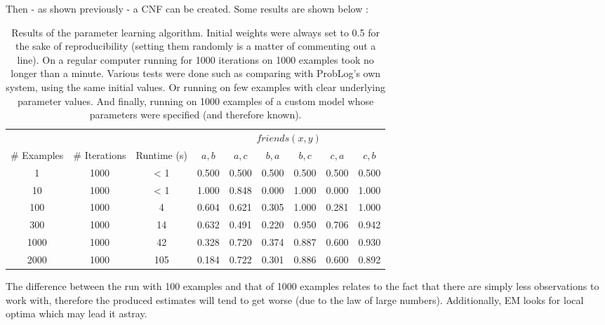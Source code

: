 \par\noindent Then - as shown previously - a CNF can be created. Some results are shown below :

\begin{table}[h]
\centering
\begin{tabular}{ccc|cccccc}
& & & \multicolumn{6}{c}{$friends(x,y)$}\\
\# Examples & \# Iterations & Runtime (s) & $a,b$ & $a,c$ & $b,a$ & $b,c$ & $c,a$ & $c,b$\\\hline
1 & 1000 & < 1 & 0.500 & 0.500 & 0.500 & 0.500 & 0.500 & 0.500 \\
10 & 1000 & < 1 & 1.000 & 0.848 & 0.000 & 1.000 & 0.000 & 1.000 \\
100 & 1000 & 4 & 0.604 & 0.621 & 0.305 & 1.000 & 0.281 & 1.000 \\
300 & 1000 & 14 & 0.632 & 0.491 & 0.220 & 0.950 & 0.706 & 0.942 \\
1000 & 1000 & 42 & 0.328 & 0.720 & 0.374 & 0.887 & 0.600 & 0.930 \\
2000 & 1000 & 105 & 0.184 & 0.722 & 0.301 & 0.886 & 0.600 & 0.892 \\
\end{tabular}
\caption{Results of the parameter learning algorithm. Initial weights were always set to 0.5 for the sake of reproducibility (setting them randomly is a matter of commenting out a line). On a regular computer running for 1000 iterations on 1000 examples took no longer than a minute. Various tests were done such as comparing with ProbLog's own system, using the same initial values. Or running on few examples with clear underlying parameter values. And finally, running on 1000 examples of a custom model whose parameters were specified (and therefore known).}
\label{plres}
\end{table}

\noindent The difference between the run with 100 examples and that of 1000 examples relates to the fact that there are simply less observations to work with, therefore the produced estimates will tend to get worse (due to the law of large numbers). Additionally, EM looks for local optima which may lead it astray.
